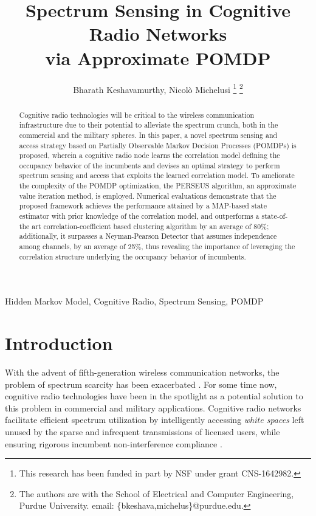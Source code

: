 \documentclass[10pt,twocolumn]{IEEEtran}
\title{Spectrum Sensing in Cognitive Radio Networks
\\
via Approximate POMDP}
\author{Bharath Keshavamurthy, Nicol\`{o} Michelusi
\thanks{This research has been funded in part by NSF under grant CNS-1642982.}
\thanks{The authors are with the School of Electrical and Computer Engineering, Purdue University. email: \{bkeshava,michelus\}@purdue.edu.}
\vspace{-5mm}}
\begin{document}
\maketitle
\thispagestyle{empty}
\pagestyle{empty} 
\begin{abstract}
Cognitive radio technologies will be critical to the wireless communication infrastructure due to their potential to alleviate the spectrum crunch, both in the commercial and the military spheres. In this paper, a novel spectrum sensing and access strategy based on Partially Observable Markov Decision Processes (POMDPs) is proposed, wherein a cognitive radio node learns the correlation model defining the occupancy behavior of the incumbents and devises an optimal strategy to perform spectrum sensing and access that exploits the learned correlation model. To ameliorate the complexity of the POMDP optimization, the PERSEUS algorithm, an approximate value iteration method, is employed. Numerical evaluations demonstrate that the proposed framework achieves the performance attained by a MAP-based state estimator with prior knowledge of the correlation model, and outperforms a state-of-the art correlation-coefficient based clustering algorithm by an average of 80\%; additionally, it surpasses a Neyman-Pearson Detector that assumes independence among channels, by an average of 25\%, thus revealing the importance of leveraging the correlation structure underlying the occupancy behavior of incumbents.
\end{abstract}
\begin{IEEEkeywords}
Hidden Markov Model, Cognitive Radio, Spectrum Sensing, POMDP
\end{IEEEkeywords}
\vspace{-5mm}
\section{Introduction}\label{I}
With the advent of fifth-generation wireless communication networks, the problem of spectrum scarcity has been exacerbated \cite{7158089}. For some time now, cognitive radio technologies have been in the spotlight as a potential solution to this problem in commercial and military applications. Cognitive radio networks facilitate efficient spectrum utilization by intelligently accessing \emph{white spaces} left unused by the sparse and infrequent transmissions of licensed users, while ensuring rigorous incumbent non-interference compliance \cite{4562537}. 
\end{document}
